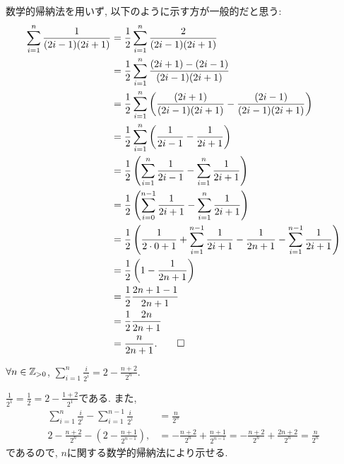 \begin{rem}
  数学的帰納法を用いず, 以下のように示す方が一般的だと思う:
  \begin{align*}
    \sum_{i=1}^n\frac{1}{(2i-1)(2i+1)}
    &=\frac{1}{2}\sum_{i=1}^n\frac{2}{(2i-1)(2i+1)}\\
    &=\frac{1}{2}\sum_{i=1}^n\frac{(2i+1)-(2i-1)}{(2i-1)(2i+1)}\\
    &=\frac{1}{2}\sum_{i=1}^n\left(\frac{(2i+1)}{(2i-1)(2i+1)}-\frac{(2i-1)}{(2i-1)(2i+1)}\right)\\
    &=\frac{1}{2}\sum_{i=1}^n\left(\frac{1}{2i-1}-\frac{1}{2i+1}\right)\\
    &=\frac{1}{2}\left(\sum_{i=1}^n\frac{1}{2i-1}-\sum_{i=1}^n\frac{1}{2i+1}\right)\\
    &=\frac{1}{2}\left(\sum_{i=0}^{n-1}\frac{1}{2i+1}-\sum_{i=1}^n\frac{1}{2i+1}\right)\\
    &=\frac{1}{2}\left(\frac{1}{2\cdot 0 + 1}+\sum_{i=1}^{n-1}\frac{1}{2i+1}-\frac{1}{2n+1}-\sum_{i=1}^{n-1}\frac{1}{2i+1}\right)\\
    &=\frac{1}{2}\left(1-\frac{1}{2n+1}\right)\\
    &=\frac{1}{2}\frac{2n+1-1}{2n+1}\\
    &=\frac{1}{2}\frac{2n}{2n+1}\\
    &=\frac{n}{2n+1}
    .\qedhere
  \end{align*}
\end{rem}


\begin{prop}
  \label{p:20230730}
  $\forall n\in \mathbb{Z}_{>0}$,
  $\sum_{i=1}^n\frac{i}{2^i}=2-\frac{n+2}{2^n}$.
\end{prop}
\begin{proof**}
  $\frac{1}{2^1}=\frac{1}{2}=2-\frac{1+2}{2^1}$である.
  また,
  \begin{align*}
    \sum_{i=1}^n\frac{i}{2^i}-\sum_{i=1}^{n-1}\frac{i}{2^i}
    &=\frac{n}{2^n}\\
    2-\frac{n+2}{2^n}-(2-\frac{n+1}{2^{n-1}}),
    &=-\frac{n+2}{2^n}+\frac{n+1}{2^{n-1}}
    =-\frac{n+2}{2^n}+\frac{2n+2}{2^{n}}
    =\frac{n}{2^{n}}
  \end{align*}
  であるので,
  $n$に関する数学的帰納法により示せる.
\end{proof**}

